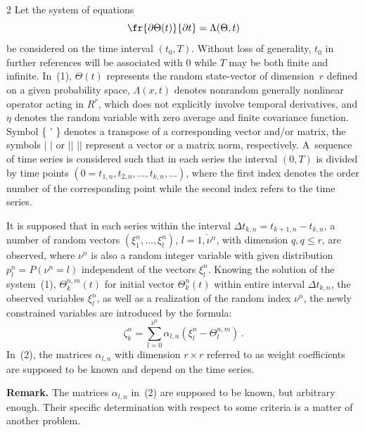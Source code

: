 \begin{multicols}{2}
\noindent
Let the system of equations
\begin{equation}
\fr{\partial{\Theta (t)}}{\partial t} = \Lambda (\Theta,t) 
\label{e1-b}
\end{equation}
be considered on the time interval $(t_0,T)$. Without loss of generality, $t_0$ in further 
references will be associated with $0$ while $T$ may be both finite and infinite. In~(1),
$\Theta (t)$ represents the random state-vector of dimension~$r$ defined on a given probability 
space, $\Lambda (x,t)$ denotes nonrandom generally nonlinear operator acting in $R^r$,  which 
does not explicitly involve temporal derivatives, and $\eta$ denotes the random variable with 
zero average and finite covariance function.
Symbol \{ ' \} denotes a transpose of a corresponding vector and/or matrix, 
the symbols $|$  $|$ or $||$  $||$ represent a vector or a matrix norm, respectively. 
A~sequence of time series is considered such that in each series the interval $(0,T)$ 
is divided by time points $(0=t_{1,n}, t_{2,n}, \dots, t_{k,n}, \dots)$, where the 
first index denotes the order number of the corresponding point while the second index 
refers to the time series. 

It is supposed that in each series within the interval 
$\Delta t_{k,n}=t_{k+1,n}-t_{k,n}$, a number of random vectors $(\xi^n_1, \dots, \xi^n_l)$, 
$l=\overline{1,\nu^n}$, with dimension $q, q\leq r$, are observed, where $\nu^n$  is also a random integer 
variable with given distribution $p^n_l=P(\nu^n=l)$ independent of the vectors $\xi^n_l$. 
Knowing the solution of the system~(1), $\Theta^{n,m}_k(t)$ for initial vector $\Theta^{n}_k(t)$ 
within entire interval $\Delta t_{k,n}$, the observed variables  $\xi^n_l$, as well as a 
realization of the random index $\nu^n$, the newly constrained variables are introduced 
by the  formula:
\begin{equation}
\zeta^n_k = \sum\limits^{\nu^n}_{l=0} \alpha_{l,n}(\xi^n_l-\Theta^{n,m}_l)\,.
\label{e2-b}
\end{equation}
In~(2), the matrices $\alpha_{l,n}$ with dimension $r \times r$ referred to as weight 
coefficients are supposed to be known and depend on the time series.

\smallskip

\noindent
\textbf{Remark.} The matrices $\alpha_{l,n}$ in~(2) are supposed to be known, but arbitrary 
enough. Their specific determination with respect to some criteria is a matter of another 
problem.

\smallskip


\end{multicols}
